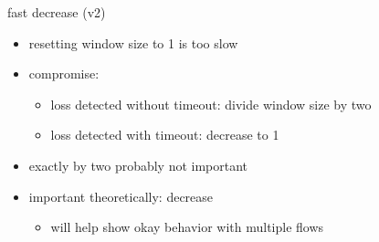 \begin{frame}{fast decrease (v2)}
    \begin{itemize}
    \item resetting window size to 1 is too slow
    \item compromise:
        \begin{itemize}
        \item loss detected without timeout: divide window size by two
        \item loss detected with timeout: decrease to 1
        \end{itemize}
    \vspace{.5cm}
    \item<2-> exactly by two probably not important
    \item<2-> important theoretically:  decrease
        \begin{itemize}
        \item will help show okay behavior with multiple flows
        \end{itemize}
    \end{itemize}
\end{frame}


